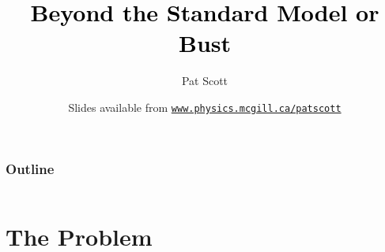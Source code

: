 \documentclass[xcolor=dvipsnames]{beamer}
\title[{\color[rgb]{0, 0, 0}Beyond the Standard Model or Bust}]{\textcolor{black}{Beyond the Standard Model or Bust}}
\author[Pat Scott -- March 14 -- UNSW]{Pat Scott}
\institute{\small{McGill University / Imperial College London}}
\date[Mar 14, 2014]{Slides available from \color[rgb]{0.1, 0.0, 0.6} \href{http://www.physics.mcgill.ca/~patscott}{\tt www.physics.mcgill.ca/{\urltilda}patscott}}
\begin{document}
\maketitle


\begin{frame}
  \frametitle{Outline}
  \begin{columns}[t]
	\tableofcontents[sections={1}]
        \vspace{3mm}
	\tableofcontents[sections={2}]
        \vspace{3mm}
	\tableofcontents[sections={3}]
  \end{columns}	
\end{frame}

\section{The Problem}
\end{document}
